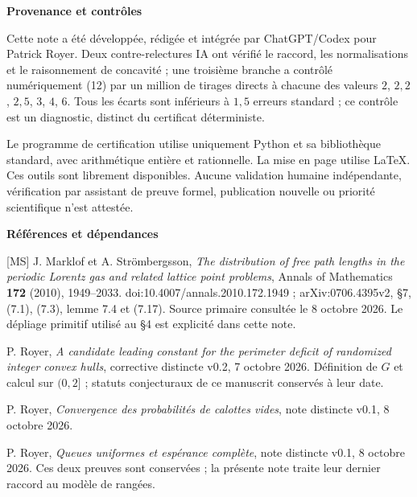 \documentclass[11pt,a4paper]{article}
\newcommand{\subhead}[1]{{\bfseries\color{navy}#1}\par}
\begin{document}
\subhead{Provenance et contrôles}
Cette note a été développée, rédigée et intégrée par ChatGPT/Codex pour Patrick Royer. Deux contre-relectures IA ont vérifié le raccord, les normalisations et le raisonnement de concavité ; une troisième branche a contrôlé numériquement (12) par un million de tirages directs à chacune des valeurs $2$, $2{,}2$, $2{,}5$, $3$, $4$, $6$. Tous les écarts sont inférieurs à $1{,}5$ erreurs standard ; ce contrôle est un diagnostic, distinct du certificat déterministe.

Le programme de certification utilise uniquement Python et sa bibliothèque standard, avec arithmétique entière et rationnelle. La mise en page utilise \LaTeX. Ces outils sont librement disponibles. Aucune validation humaine indépendante, vérification par assistant de preuve formel, publication nouvelle ou priorité scientifique n'est attestée.

\subhead{Références et dépendances}
{\small
[MS] J. Marklof et A. Strömbergsson, \emph{The distribution of free path lengths in the periodic Lorentz gas and related lattice point problems}, Annals of Mathematics \textbf{172} (2010), 1949--2033. doi:10.4007/annals.2010.172.1949 ; arXiv:0706.4395v2, §7, (7.1), (7.3), lemme 7.4 et (7.17). Source primaire consultée le 8 octobre 2026. Le dépliage primitif utilisé au §4 est explicité dans cette note.\par
[M] P. Royer, \emph{A candidate leading constant for the perimeter deficit of randomized integer convex hulls}, corrective distincte v0.2, 7 octobre 2026. Définition de $G$ et calcul sur $(0,2]$ ; statuts conjecturaux de ce manuscrit conservés à leur date.\par
[CV] P. Royer, \emph{Convergence des probabilités de calottes vides}, note distincte v0.1, 8 octobre 2026.\par
[QU] P. Royer, \emph{Queues uniformes et espérance complète}, note distincte v0.1, 8 octobre 2026. Ces deux preuves sont conservées ; la présente note traite leur dernier raccord au modèle de rangées.\par
}
\end{document}

